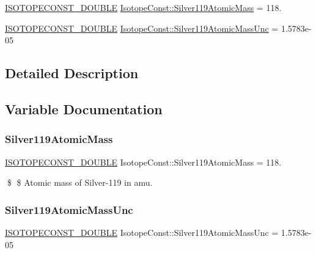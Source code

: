 \begin{DoxyCompactItemize}
\item 
\mbox{\hyperlink{group___isotope_const-_macros_ga8f45a7272ce02c0b4c65c44636ed719a}{I\+S\+O\+T\+O\+P\+E\+C\+O\+N\+S\+T\+\_\+\+D\+O\+U\+B\+LE}} \mbox{\hyperlink{group___isotope_const-_silver-_ag119_ga9b7365b4d217361fe64557fccf76e010}{Isotope\+Const\+::\+Silver119\+Atomic\+Mass}} = 118.
\item 
\mbox{\hyperlink{group___isotope_const-_macros_ga8f45a7272ce02c0b4c65c44636ed719a}{I\+S\+O\+T\+O\+P\+E\+C\+O\+N\+S\+T\+\_\+\+D\+O\+U\+B\+LE}} \mbox{\hyperlink{group___isotope_const-_silver-_ag119_ga467f34f236f38e764801e767960dd655}{Isotope\+Const\+::\+Silver119\+Atomic\+Mass\+Unc}} = 1.\+5783e-\/05
\end{DoxyCompactItemize}


\subsection{Detailed Description}


\subsection{Variable Documentation}
\mbox{\label{group___isotope_const-_silver-_ag119_ga9b7365b4d217361fe64557fccf76e010}} 
\subsubsection{\texorpdfstring{Silver119\+Atomic\+Mass}{Silver119AtomicMass}}
{\footnotesize\ttfamily \mbox{\hyperlink{group___isotope_const-_macros_ga8f45a7272ce02c0b4c65c44636ed719a}{I\+S\+O\+T\+O\+P\+E\+C\+O\+N\+S\+T\+\_\+\+D\+O\+U\+B\+LE}} Isotope\+Const\+::\+Silver119\+Atomic\+Mass = 118.}

\$ \$ Atomic mass of Silver-\/119 in amu. \mbox{\label{group___isotope_const-_silver-_ag119_ga467f34f236f38e764801e767960dd655}} 
\subsubsection{\texorpdfstring{Silver119\+Atomic\+Mass\+Unc}{Silver119AtomicMassUnc}}
{\footnotesize\ttfamily \mbox{\hyperlink{group___isotope_const-_macros_ga8f45a7272ce02c0b4c65c44636ed719a}{I\+S\+O\+T\+O\+P\+E\+C\+O\+N\+S\+T\+\_\+\+D\+O\+U\+B\+LE}} Isotope\+Const\+::\+Silver119\+Atomic\+Mass\+Unc = 1.\+5783e-\/05}

